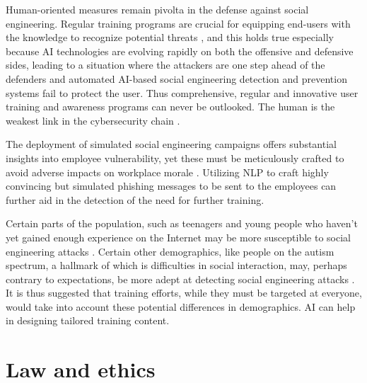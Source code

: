 Human-oriented measures remain pivolta in the defense against social engineering. Regular training programs are crucial for equipping end-users with the knowledge to recognize potential threats \citep{hadnagySocialEngineering2018}, and this holds true especially because AI technologies are evolving rapidly on both the offensive and defensive sides, leading to a situation where the attackers are one step ahead of the defenders and automated AI-based social engineering detection and prevention systems fail to protect the user. Thus comprehensive, regular and innovative user training and awareness programs can never be outlooked. The human is the weakest link in the cybersecurity chain \citep{mitnick_The_Art_of_Deception_2003}.

The deployment of simulated social engineering campaigns offers substantial insights into employee vulnerability, yet these must be meticulously crafted to avoid adverse impacts on workplace morale \citep{mitnick_The_Art_of_Deception_2003}. Utilizing NLP to craft highly convincing but simulated phishing messages to be sent to the employees can further aid in the detection of the need for further training.

Certain parts of the population, such as teenagers and young people who haven't yet gained enough experience on the Internet may be more susceptible to social engineering attacks \citep{nicholsonInvestigatingTeenagersAbilityDetectPhishingMessages2020}. Certain other demographics, like people on the autism spectrum, a hallmark of which is difficulties in social interaction, may, perhaps contrary to expectations, be more adept at detecting social engineering attacks \citep{neupaneDoSocialDisordersFacilitateSocialEngineeringAutismPhishing2018}. It is thus suggested that training efforts, while they must be targeted at everyone, would take into account these potential differences in demographics. AI can help in designing tailored training content.

















\section{Law and ethics}

